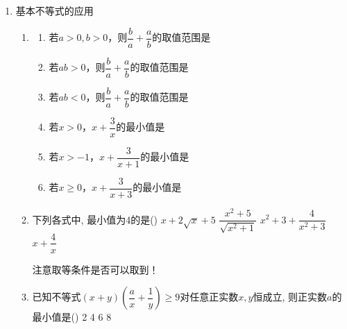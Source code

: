 \begin{enumerate}
\begin{enumerate}
\begin{enumerate}
        \item 若关于$x$的不等式$\abs{x-1}-\abs{x-2}<a$的解集为$\varnothing$, 则实数$a$的取值范围为. 
    \end{enumerate}
    \begin{jieda}
        斜坡函数$f(x) = |x+a|-|x+b|$，最大值为$|a-b|$，最小值为$-|a-b|$. \\
        例如：$f(x) = |x+1|-|x+2| = \left \{ \begin{array}{ll}
            1 & x < -2 \\
            -2x-3 & x \in [-2, -1] \\
            -1 & x > -1 \\
        \end{array}\right.$
    \end{jieda}
    \end{enumerate}
    \item 基本不等式的应用
    \begin{enumerate}
        \item 
        \begin{enumerate}
            \item 若$a > 0, b > 0$，则$\dfrac{b}{a}+\dfrac{a}{b}$的取值范围是\blkda{$[2, +\infty)$}
            \item 若$ab > 0$，则$\dfrac{b}{a}+\dfrac{a}{b}$的取值范围是\blkda{$[2, +\infty)$}
            \item 若$ab < 0$，则$\dfrac{b}{a}+\dfrac{a}{b}$的取值范围是\blkda{$(-\infty, -2]$}
            \item 若$x > 0$，$x + \dfrac{3}{x}$的最小值是
            \item 若$x > -1$，$x + \dfrac{3}{x+1}$的最小值是
            \item 若$x \geq 0$，$x + \dfrac{3}{x+3}$的最小值是
        \end{enumerate}
        \item 下列各式中, 最小值为4的是\dotfill()
        \xx
        {$x+2\sqrt{x}+5$}
        {$\dfrac{x^2+5}{\sqrt{x^2+1}}$}
        {$x^2+3+\dfrac{4}{x^2+3}$}
        {$x+\dfrac{4}{x}$}
        \begin{jieda}
            注意取等条件是否可以取到！
        \end{jieda}
        \item 已知不等式$(x+y)\left(\dfrac{a}{x}+\dfrac{1}{y}\right)\geq 9$对任意正实数$x,y$恒成立, 则正实数$a$的最小值是\dotfill()
        \xx
        {2}
        {4}
        {6}
        {8}

\end{enumerate}
\end{enumerate}
